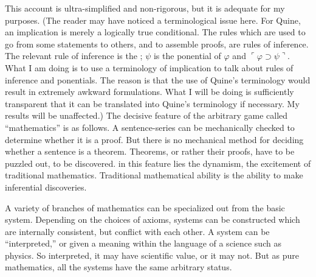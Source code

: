 This account is ultra-simplified and non-rigorous, but it is adequate for 
my purposes. (The reader may have noticed a terminological issue here. For 
Quine, an implication is merely a logically true conditional. The rules which 
are used to go from some statements to others, and to assemble proofs, are 
rules of inference. The relevant rule of inference is the ; $\psi$ is 
the ponential of $\varphi$ and $\ulcorner \varphi \supset \psi \urcorner$. What I 
am doing is to use a terminology of 
implication to talk about rules of inference and ponentials. The reason is 
that the use of Quine's terminology would result in extremely awkward 
formulations. What I will be doing is sufficiently transparent that it can be 
translated into Quine's terminology if necessary. My results will be 
unaffected.) The decisive feature of the arbitrary game called \enquote{mathematics} 
is as follows. A sentence-series can be mechanically checked to determine 
whether it is a proof. But there is no mechanical method for deciding 
whether a sentence is a theorem. Theorems, or rather their proofs, have to be 
puzzled out, to be discovered. in this feature lies the dynamism, the 
excitement of traditional mathematics. Traditional mathematical ability is 
the ability to make inferential discoveries. 

A variety of branches of mathematics can be specialized out from the 
basic system. Depending on the choices of axioms, systems can be 
constructed which are internally consistent, but conflict with each other. A 
system can be \enquote{interpreted,} or given a meaning within the language of a 
science such as physics. So interpreted, it may have scientific value, or it may 
not. But as pure mathematics, all the systems have the same arbitrary status. 

